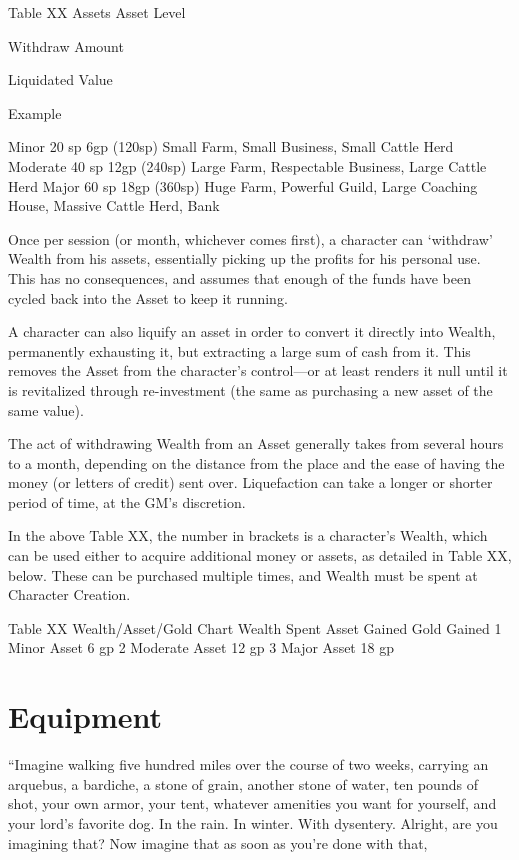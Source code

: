 \documentclass[oneside,11pt,english]{book}
\begin{document}
 
Table XX Assets 
Asset 
Level 

Withdraw 
Amount 

Liquidated 
Value 

Example 

Minor 20 sp 6gp (120sp) Small Farm, Small Business, Small Cattle Herd 
Moderate 40 sp 12gp (240sp) Large Farm, Respectable Business, Large Cattle Herd 
Major 60 sp 18gp (360sp) Huge Farm, Powerful Guild, Large Coaching House, Massive 
Cattle Herd, Bank 

 

Once per session (or month, whichever comes first), a character can ‘withdraw’ Wealth from his assets, 
essentially picking up the profits for his personal use. This has no consequences, and assumes that enough 
of the funds have been cycled back into the Asset to keep it running. 

 

A character can also liquify an asset in order to convert it directly into Wealth, permanently exhausting it, 
but extracting a large sum of cash from it. This removes the Asset from the character’s control—or at 
least renders it null until it is revitalized through re-investment (the same as purchasing a new asset of the 
same value). 

 

The act of withdrawing Wealth from an Asset generally takes from several hours to a month, depending 
on the distance from the place and the ease of having the money (or letters of credit) sent over. 
Liquefaction can take a longer or shorter period of time, at the GM’s discretion. 

 

In the above Table XX, the number in brackets is a character’s Wealth, which can be used either to 
acquire additional money or assets, as detailed in Table XX, below. These can be purchased multiple 
times, and Wealth must be spent at Character Creation. 

 
Table XX Wealth/Asset/Gold Chart 
Wealth Spent Asset Gained Gold Gained 
1 Minor Asset 6 gp 
2 Moderate Asset 12 gp 
3 Major Asset 18 gp 

 

\chapter{Equipment}\label{ch:equipment} 
\clearpage
 

“Imagine walking five hundred miles over the course of two weeks, carrying an arquebus, a bardiche, a stone of grain, another 
stone of water, ten pounds of shot, your own armor, your tent, whatever amenities you want for yourself, and your lord’s favorite 
dog. In the rain. In winter. With dysentery. Alright, are you imagining that? Now imagine that as soon as you’re done with that, 
\end{document}
